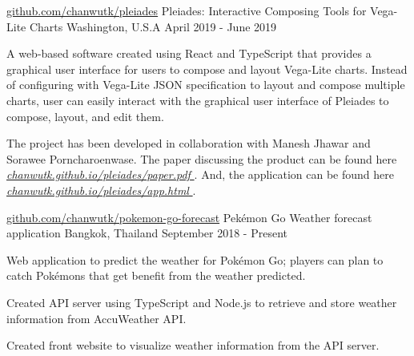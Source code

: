 

\begin{cventries}

  \cventry
    {\href{http://www.github.com/chanwutk/pleiades}{github.com/chanwutk/pleiades}} %
    {Pleiades: Interactive Composing Tools for Vega-Lite Charts} %
    {Washington, U.S.A} %
    {April 2019 - June 2019} %
    {
      \begin{cvitems} %
        \item {
          A web-based software created using React and TypeScript that provides a graphical user interface for users to compose and layout Vega-Lite charts.
          Instead of configuring with Vega-Lite JSON specification to layout and compose multiple charts, user can easily interact with the graphical user interface of Pleiades to compose, layout, and edit them.
        }
        \item {
          The project has been developed in collaboration with Manesh Jhawar and Sorawee Porncharoenwase.
          The paper discussing the product can be found here
          \href{https://chanwutk.github.io/pleiades/paper.pdf}{
            \textit{chanwutk.github.io/pleiades/paper.pdf}
          }.
          And, the application can be found here
          \href{https://chanwutk.github.io/pleiades/app.html}{
            \textit{chanwutk.github.io/pleiades/app.html}
          }.
        }
      \end{cvitems}
    }

  \cventry
    {\href{http://github.com/chanwutk/pokemon-go-forecast}{github.com/chanwutk/pokemon-go-forecast}} %
    {Pekémon Go Weather forecast application} %
    {Bangkok, Thailand} %
    {September 2018 - Present} %
    {
      \begin{cvitems} %
        \item {
          Web application to predict the weather for Pokémon Go;
          players can plan to catch Pokémons that get benefit from the weather predicted.
        }
        \item {
          Created API server using TypeScript and Node.js to retrieve and store weather information from AccuWeather API.
        }
        \item {
          Created front website to visualize weather information from the API server.
        }
      \end{cvitems}
    }


\end{cventries}

